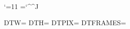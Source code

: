 \catcode`\@=11
\newlinechar=`\^^J

\newcount\SCRW    {}
\newcount\SCRH    {}
\newcount\PIXSZ   {}
\newcount\NFRAMES {}
\expandafter\ifx\csname DTW\endcsname\relax\else\SCRW=\DTW\relax\fi
\expandafter\ifx\csname DTH\endcsname\relax\else\SCRH=\DTH\relax\fi
\expandafter\ifx\csname DTPIX\endcsname\relax\else\PIXSZ=\DTPIX\relax\fi
\expandafter\ifx\csname DTFRAMES\endcsname\relax\else\NFRAMES=\DTFRAMES\relax\fi

